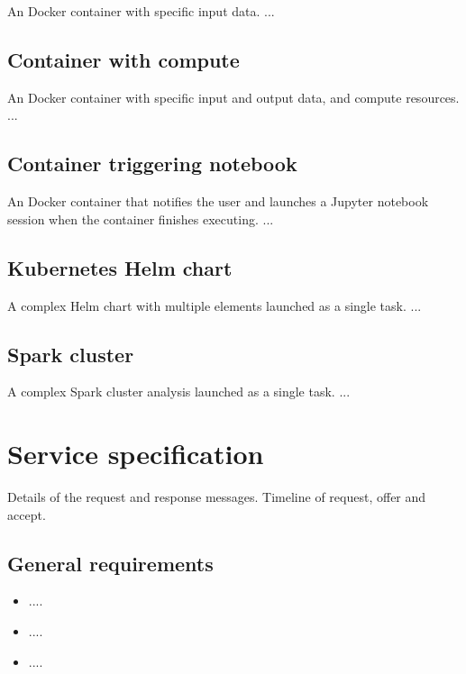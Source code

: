 \documentclass[11pt,a4paper]{ivoa}
\newcommand{\jupyternotebook} {Jupyter notebook}
\newcommand{\dockercontainer} {Docker container}
\begin{document}
An \dockercontainer{} with specific input data.
...

\subsection{Container with compute}
\label{container-with-compute}

An \dockercontainer{} with specific input and output data, and compute resources.
...

\subsection{Container triggering notebook}
\label{container-triggering-notebook}

An \dockercontainer{} that notifies the user and launches a \jupyternotebook{} session
when the container finishes executing.
...

\subsection{Kubernetes Helm chart}
\label{kubernetes-helm}

A complex Helm chart with multiple elements launched as a single task.
...

\subsection{Spark cluster}
\label{spark-cluster}

A complex Spark cluster analysis launched as a single task.
...

\pagebreak

\section{Service specification}
\label{service-specification}

Details of the request and response messages.
Timeline of request, offer and accept.

\subsection{General requirements}
\label{general-requirements}

\begin{itemize}
    \item ....
    \item ....
    \item ....
\end{itemize}
\end{document}
